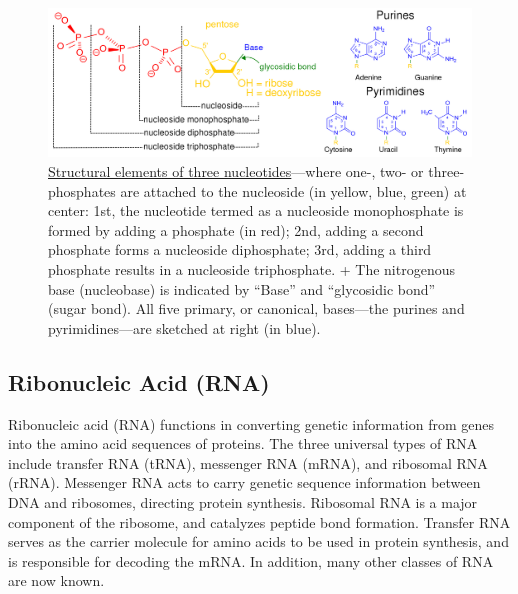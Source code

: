 \begin{figure}

{\centering \includegraphics[width=0.7\linewidth]{./figures/chemistry/Nucleotides_1} 

}

\caption{\href{https://commons.wikimedia.org/wiki/File:Nucleotides_1.svg}{Structural elements of three nucleotides}---where one-, two- or three-phosphates are attached to the nucleoside (in yellow, blue, green) at center: 1st, the nucleotide termed as a nucleoside monophosphate is formed by adding a phosphate (in red); 2nd, adding a second phosphate forms a nucleoside diphosphate; 3rd, adding a third phosphate results in a nucleoside triphosphate. + The nitrogenous base (nucleobase) is indicated by ``Base'' and ``glycosidic bond'' (sugar bond). All five primary, or canonical, bases---the purines and pyrimidines---are sketched at right (in blue).}\label{fig:structurenucleotide}
\end{figure}

\hypertarget{ribonucleic-acid-rna}{%
\subsection{Ribonucleic Acid (RNA)}\label{ribonucleic-acid-rna}}

Ribonucleic acid (RNA) functions in converting genetic information from genes into the amino acid sequences of proteins. The three universal types of RNA include transfer RNA (tRNA), messenger RNA (mRNA), and ribosomal RNA (rRNA). Messenger RNA acts to carry genetic sequence information between DNA and ribosomes, directing protein synthesis. Ribosomal RNA is a major component of the ribosome, and catalyzes peptide bond formation. Transfer RNA serves as the carrier molecule for amino acids to be used in protein synthesis, and is responsible for decoding the mRNA. In addition, many other classes of RNA are now known.


